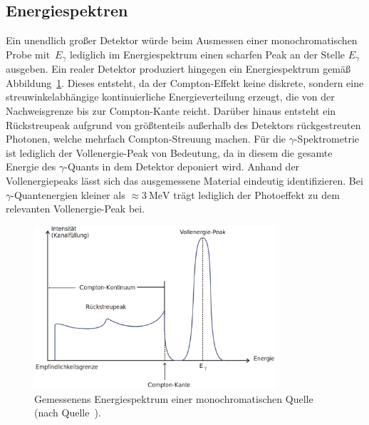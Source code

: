 \subsection{Energiespektren}
\label{subsec:energiespektrum}

Ein unendlich großer Detektor würde beim Ausmessen einer monochromatischen Probe mit~$E_\gamma$
lediglich im Energiespektrum einen scharfen Peak an der Stelle $E_\gamma$
ausgeben. Ein realer Detektor produziert hingegen ein Energiespektrum gemäß
Abbildung~\ref{fig:spektrum}. Dieses entsteht, da der Compton-Effekt
keine diskrete, sondern eine streuwinkelabhängige kontinuierliche Energieverteilung
erzeugt, die von der Nachweisgrenze bis zur Compton-Kante reicht.
Darüber hinaus entsteht ein Rückstreupeak aufgrund von größtenteils
außerhalb des Detektors rückgestreuten Photonen, welche mehrfach Compton-Streuung
machen.
Für die $\gamma$-Spektrometrie ist lediglich der Vollenergie-Peak
von Bedeutung, da in diesem die gesamte Energie des $\gamma$-Quants
in dem Detektor deponiert wird. Anhand der Vollenergiepeaks lässt
sich das ausgemessene Material eindeutig identifizieren.
Bei $\gamma$-Quantenergien kleiner als $\approx\SI{3}{\MeV}$ trägt lediglich der
Photoeffekt zu dem relevanten Vollenergie-Peak bei.


\begin{figure}
  \centering
  \includegraphics[width=0.8\textwidth]{Pics/spektrum.pdf}
  \caption{Gemessenens Energiespektrum einer monochromatischen Quelle (nach Quelle~\cite{anleitung}).}
  \label{fig:spektrum}
\end{figure}
\FloatBarrier
